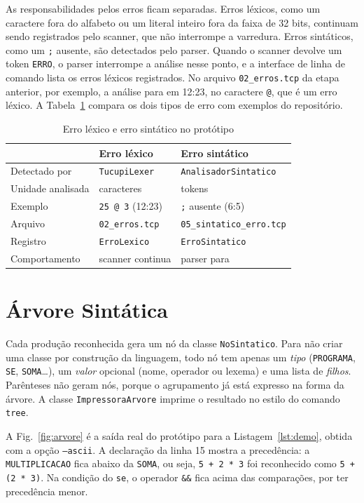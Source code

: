 \documentclass[conference,a4paper]{IEEEtran}
\newcommand{\cod}[1]{\texttt{#1}}
\begin{document}
As responsabilidades pelos erros ficam separadas. Erros léxicos, como um caractere fora do alfabeto ou um literal inteiro fora da faixa de 32 bits, continuam sendo registrados pelo scanner, que não interrompe a varredura. Erros sintáticos, como um \cod{;} ausente, são detectados pelo parser. Quando o scanner devolve um token \cod{ERRO}, o parser interrompe a análise nesse ponto, e a interface de linha de comando lista os erros léxicos registrados. No arquivo \cod{02\_erros.tcp} da etapa anterior, por exemplo, a análise para em 12:23, no caractere \cod{@}, que é um erro léxico. A Tabela~\ref{tab:erros} compara os dois tipos de erro com exemplos do repositório.

\begin{table}[t]
\caption{Erro léxico e erro sintático no protótipo}
\label{tab:erros}
\centering
\scriptsize
\begin{tabular}{@{}lll@{}}
\toprule
 & Erro léxico & Erro sintático \\
\midrule
Detectado por & \cod{TucupiLexer} & \cod{AnalisadorSintatico} \\
Unidade analisada & caracteres & tokens \\
Exemplo & \cod{25 @ 3} (12:23) & \cod{;} ausente (6:5) \\
Arquivo & \cod{02\_erros.tcp} & \cod{05\_sintatico\_erro.tcp} \\
Registro & \cod{ErroLexico} & \cod{ErroSintatico} \\
Comportamento & scanner continua & parser para \\
\bottomrule
\end{tabular}
\end{table}

\section{Árvore Sintática}

Cada produção reconhecida gera um nó da classe \cod{NoSintatico}. Para não criar uma classe por construção da linguagem, todo nó tem apenas um \emph{tipo} (\cod{PROGRAMA}, \cod{SE}, \cod{SOMA}\ldots), um \emph{valor} opcional (nome, operador ou lexema) e uma lista de \emph{filhos}. Parênteses não geram nós, porque o agrupamento já está expresso na forma da árvore. A classe \cod{ImpressoraArvore} imprime o resultado no estilo do comando \cod{tree}.

A Fig.~\ref{fig:arvore} é a saída real do protótipo para a Listagem~\ref{lst:demo}, obtida com a opção \cod{--ascii}. A declaração da linha 15 mostra a precedência: a \cod{MULTIPLICACAO} fica abaixo da \cod{SOMA}, ou seja, \cod{5 + 2 * 3} foi reconhecido como \cod{5 + (2 * 3)}. Na condição do \cod{se}, o operador \cod{\&\&} fica acima das comparações, por ter precedência menor.
\end{document}
